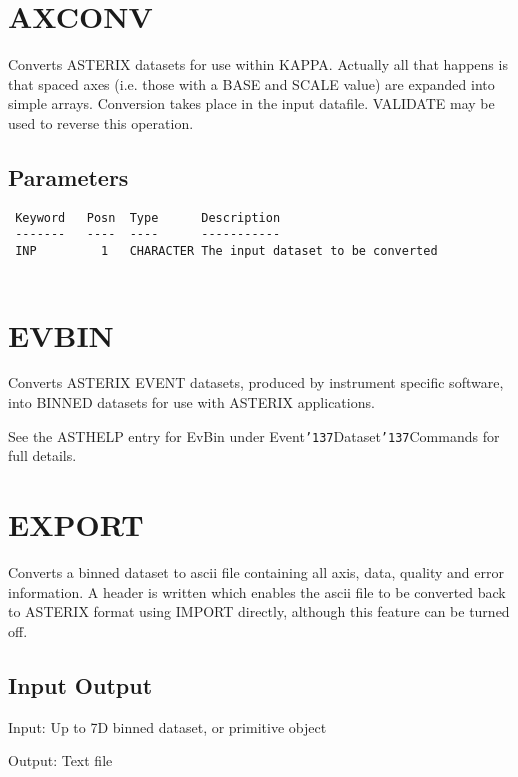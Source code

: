 \documentclass{book}
\renewcommand{\_}{{\tt\char'137}}     %
\begin{document}
\section{AXCONV}
Converts ASTERIX datasets for use within KAPPA. Actually all that happens
is that spaced axes (i.e. those with a BASE and SCALE value) are
expanded into simple arrays. Conversion takes place in the input
datafile. VALIDATE may be used to reverse this operation.
 
\subsection{Parameters}
\begin{verbatim}
 Keyword   Posn  Type      Description
 -------   ----  ----      -----------
 INP         1   CHARACTER The input dataset to be converted
 
\end{verbatim}\section{EVBIN}
Converts ASTERIX EVENT datasets, produced by instrument specific
software, into BINNED datasets for use with ASTERIX applications.
 
See the ASTHELP entry for EvBin under Event\_Dataset\_Commands for
full details.
 
\section{EXPORT}
Converts a binned dataset to ascii file containing all axis, data,
quality and error information. A header is written which enables
the ascii file to be converted back to ASTERIX format using IMPORT
directly, although this feature can be turned off.
 
\subsection{Input Output}
Input: Up to 7D binned dataset, or primitive object
 
Output: Text file
 
\end{document}
